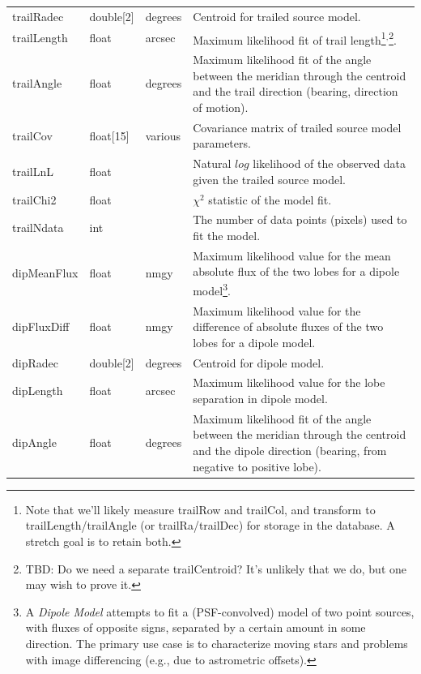 \documentclass[12pt]{article}
\begin{document}
\begin{center}
\begin{longtable}{p{3cm}p{2cm}p{2cm}p{5cm}}
trailRadec & double[2] & degrees & Centroid for trailed source model. \\

trailLength & float & arcsec & Maximum likelihood fit of trail length\footnote{Note that we'll likely measure trailRow and trailCol, and transform to trailLength/trailAngle (or trailRa/trailDec) for storage in the database. A stretch goal is to retain both.}$^,$\footnote{TBD: Do we need a separate trailCentroid? It's unlikely that we do, but one may wish to prove it.}. \\

trailAngle & float & degrees & Maximum likelihood fit of the angle between the meridian through the centroid and the trail direction (bearing, direction of motion). \\

trailCov & float[15] & various & Covariance matrix of trailed source model parameters. \\

trailLnL & float & ~ & Natural $log$ likelihood of the observed data given the trailed source model. \\

trailChi2 & float & ~ & $\chi^2$ statistic of the model fit. \\

trailNdata & int & ~ & The number of data points (pixels) used to fit the model. \\

dipMeanFlux & float & nmgy & Maximum likelihood value for the mean absolute flux of the two lobes for a dipole model\footnote{A {\em Dipole Model} attempts to fit a (PSF-convolved) model of two point sources, with fluxes
of opposite signs, separated by a certain amount in some direction. The primary use case is to characterize moving stars and problems with image differencing (e.g., due to astrometric offsets).}.
\\

dipFluxDiff & float & nmgy & Maximum likelihood value for the difference of absolute fluxes of the two lobes for a dipole model.
\\

dipRadec & double[2] & degrees & Centroid for dipole model. \\

dipLength & float & arcsec & Maximum likelihood value for the lobe separation in dipole model. \\

dipAngle & float & degrees & Maximum likelihood fit of the angle between the meridian through the centroid and the dipole direction (bearing, from negative to positive lobe). \\


\end{longtable}
\end{center}
\end{document}

